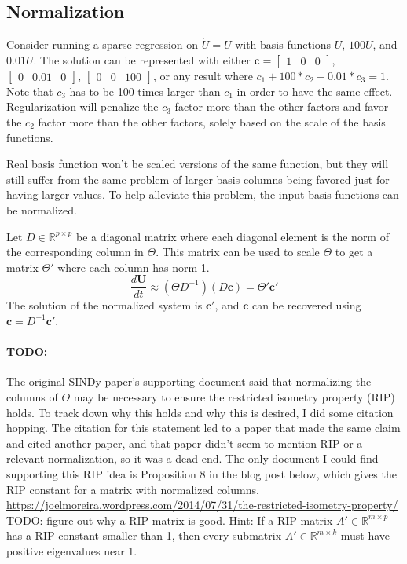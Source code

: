 \documentclass{article}
\let\vec\mathbf
\def\real{\mathbb{R}}
\begin{document}
\subsection{Normalization}

Consider running a sparse regression on $\dot{U} = U$ with basis functions $U$,
$100U$, and $0.01U$. The solution can be represented with either $\vec{c} =
\begin{bmatrix} 1 & 0 & 0 \end{bmatrix}$, $\begin{bmatrix} 0 & 0.01 & 0
\end{bmatrix}$, $\begin{bmatrix} 0 & 0 & 100 \end{bmatrix}$, or any result where
$c_1 + 100*c_2 + 0.01*c_3 = 1$. Note that $c_3$ has to be 100 times larger than
$c_1$ in order to have the same effect. Regularization will penalize the $c_3$
factor more than the other factors and favor the $c_2$ factor more than the
other factors, solely based on the scale of the basis functions.

Real basis function won't be scaled versions of the same function, but they will
still suffer from the same problem of larger basis columns being favored just
for having larger values. To help alleviate this problem, the input basis
functions can be normalized.

Let $D \in \real^{p \times p}$ be a diagonal matrix where each diagonal element
is the norm of the corresponding column in $\Theta$. This matrix can be
used to scale $\Theta$ to get a matrix $\Theta'$ where each column has norm 1.
\begin{equation}\label{eq:normalized-system}
\frac{d\vec{U}}{dt} \approx (\Theta D^{-1}) (D\vec{c}) = \Theta' \vec{c'}
\end{equation}
The solution of the normalized system is $\vec{c'}$, and $\vec{c}$ can be
recovered using $\vec{c} = D^{-1} \vec{c'}$.

\paragraph{TODO:} The original SINDy paper's supporting document \cite{brunton-sindy-appendix}
said that normalizing the columns of $\Theta$ may be necessary to ensure
the restricted isometry property (RIP) holds. To track down why this holds and
why this is desired, I did some citation hopping. The citation for this
statement led to a paper that made the same claim and cited another paper, and
that paper didn't seem to mention RIP or a relevant normalization, so it was a
dead end. The only document I could find supporting this RIP idea is Proposition 8 in the
blog post below, which gives the RIP constant for a matrix with normalized
columns.
\url{https://joelmoreira.wordpress.com/2014/07/31/the-restricted-isometry-property/}
TODO: figure out why a RIP matrix is good.
Hint: If a RIP matrix $A' \in \real^{m \times p}$ has a RIP constant smaller than 1,
then every submatrix $A' \in \real^{m \times k}$ must have positive eigenvalues
near 1.
\end{document}
